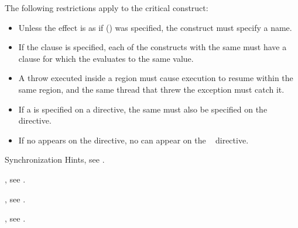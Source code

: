 \restrictions
The following restrictions apply to the critical construct:

\begin{itemize}
\item Unless the effect is as if () was 
      specified, the  construct must specify a name.
\item If the  clause is specified, each of the  
      constructs with the same  must have a  clause 
      for which the  evaluates to the same value.
\end{itemize}

\begin{cppspecific}
\begin{itemize}
\item A throw executed inside a  region must cause execution 
      to resume within the same  region, and the same thread 
      that threw the exception must catch it.
\end{itemize}
\end{cppspecific}

\begin{fortranspecific}
\begin{itemize}
\item If a  is specified on a  directive, the same 
       must also be specified on the ~ directive.
\item If no  appears on the  directive, no  
      can appear on the ~ directive.
\end{itemize}
\end{fortranspecific}

\begin{crossrefs}
\item Synchronization Hints, see
.

\item {}, see
.

\item {}, see
.

\item {}, see
.
\end{crossrefs}



